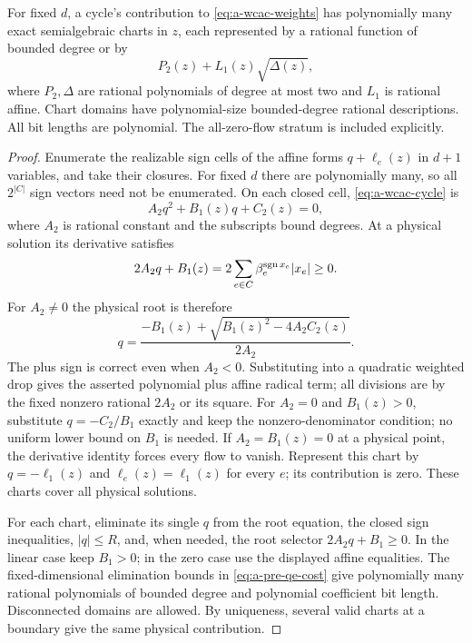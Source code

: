 \begin{lemma}
\label{lem:a-wcac-local}
For fixed $d$, a cycle's contribution to \eqref{eq:a-wcac-weights} has
polynomially many exact semialgebraic charts in $z$, each represented by
a rational function of bounded degree or by
\[
 P_2(z)+L_1(z)\sqrt{\Delta(z)},
\]
where $P_2,\Delta$ are rational polynomials of degree at most two and
$L_1$ is rational affine. Chart domains have polynomial-size
bounded-degree rational descriptions. All bit lengths are polynomial.
The all-zero-flow stratum is included explicitly.
\end{lemma}
\begin{proof}
Enumerate the realizable sign cells of the affine forms $q+\ell_e(z)$ in
$d+1$ variables, and take their closures. For fixed $d$ there are
polynomially many, so all $2^{|C|}$ sign vectors need not be enumerated.
On each closed cell, \eqref{eq:a-wcac-cycle} is
\[
 A_2q^2+B_1(z)q+C_2(z)=0,
\]
where $A_2$ is rational constant and the subscripts bound degrees. At a
physical solution its derivative satisfies
\[
 2A_2q+B_1(z)=2\sum_{e\in C}\beta_e^{\operatorname{sgn} x_e}|x_e|\ge0.
\]
For $A_2\ne0$ the physical root is therefore
\begin{equation}
 q=\frac{-B_1(z)+\sqrt{B_1(z)^2-4A_2C_2(z)}}{2A_2}.
 \label{eq:a-wcac-root}
\end{equation}
The plus sign is correct even when $A_2<0$. Substituting into a quadratic
weighted drop gives the asserted polynomial plus affine radical term;
all divisions are by the fixed nonzero rational $2A_2$ or its square.
For $A_2=0$ and $B_1(z)>0$, substitute $q=-C_2/B_1$ exactly and keep the
nonzero-denominator condition; no uniform lower bound on $B_1$ is needed.
If $A_2=B_1(z)=0$ at a physical point, the derivative identity forces every
flow to vanish. Represent this chart by
$q=-\ell_1(z)$ and $\ell_e(z)=\ell_1(z)$ for every $e$; its contribution
is zero. These charts cover all physical solutions.

For each chart, eliminate its single $q$ from the root equation, the
closed sign inequalities, $|q|\le R$, and, when needed, the root selector
$2A_2q+B_1\ge0$. In the linear case keep $B_1>0$; in the zero
case use the displayed affine equalities. The fixed-dimensional
elimination bounds in \eqref{eq:a-pre-qe-cost} give polynomially many
rational polynomials of bounded degree and polynomial coefficient bit
length. Disconnected domains are allowed. By uniqueness, several valid
charts at a boundary give the same physical contribution.
\end{proof}


